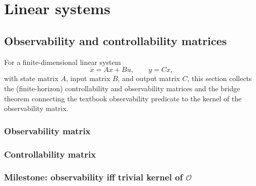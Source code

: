 


\chapter{Linear systems}

\section{Observability and controllability matrices}

For a finite-dimensional linear system
\[
  \dot{x} = A x + B u, \qquad y = C x,
\]
with state matrix $A$, input matrix $B$, and output matrix $C$, this section
collects the (finite-horizon) controllability and observability matrices and
the bridge theorem connecting the textbook observability predicate to the
kernel of the observability matrix.

\subsection{Observability matrix}





\subsection{Controllability matrix}




\subsection{Milestone: observability iff trivial kernel of \texorpdfstring{$\mathcal{O}$}{O}}


